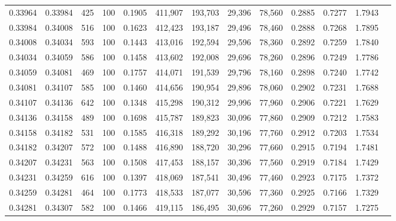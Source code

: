 \begin{tabular}{rrrrrrrrrrrrr}
0.33964 & 0.33984 &    425 & 100 &                                     0.1905 & 411,907 & 193,703 &  29,396 &  78,560 & 0.2885 & 0.7277 & 1.7943 \\
0.33984 & 0.34008 &    516 & 100 &                                     0.1623 & 412,423 & 193,187 &  29,496 &  78,460 & 0.2888 & 0.7268 & 1.7895 \\
0.34008 & 0.34034 &    593 & 100 &                                     0.1443 & 413,016 & 192,594 &  29,596 &  78,360 & 0.2892 & 0.7259 & 1.7840 \\
0.34034 & 0.34059 &    586 & 100 &                                     0.1458 & 413,602 & 192,008 &  29,696 &  78,260 & 0.2896 & 0.7249 & 1.7786 \\
0.34059 & 0.34081 &    469 & 100 &                                     0.1757 & 414,071 & 191,539 &  29,796 &  78,160 & 0.2898 & 0.7240 & 1.7742 \\
0.34081 & 0.34107 &    585 & 100 &                                     0.1460 & 414,656 & 190,954 &  29,896 &  78,060 & 0.2902 & 0.7231 & 1.7688 \\
0.34107 & 0.34136 &    642 & 100 &                                     0.1348 & 415,298 & 190,312 &  29,996 &  77,960 & 0.2906 & 0.7221 & 1.7629 \\
0.34136 & 0.34158 &    489 & 100 &                                     0.1698 & 415,787 & 189,823 &  30,096 &  77,860 & 0.2909 & 0.7212 & 1.7583 \\
0.34158 & 0.34182 &    531 & 100 &                                     0.1585 & 416,318 & 189,292 &  30,196 &  77,760 & 0.2912 & 0.7203 & 1.7534 \\
0.34182 & 0.34207 &    572 & 100 &                                     0.1488 & 416,890 & 188,720 &  30,296 &  77,660 & 0.2915 & 0.7194 & 1.7481 \\
0.34207 & 0.34231 &    563 & 100 &                                     0.1508 & 417,453 & 188,157 &  30,396 &  77,560 & 0.2919 & 0.7184 & 1.7429 \\
0.34231 & 0.34259 &    616 & 100 &                                     0.1397 & 418,069 & 187,541 &  30,496 &  77,460 & 0.2923 & 0.7175 & 1.7372 \\
0.34259 & 0.34281 &    464 & 100 &                                     0.1773 & 418,533 & 187,077 &  30,596 &  77,360 & 0.2925 & 0.7166 & 1.7329 \\
0.34281 & 0.34307 &    582 & 100 &                                     0.1466 & 419,115 & 186,495 &  30,696 &  77,260 & 0.2929 & 0.7157 & 1.7275 \\

\end{tabular}
